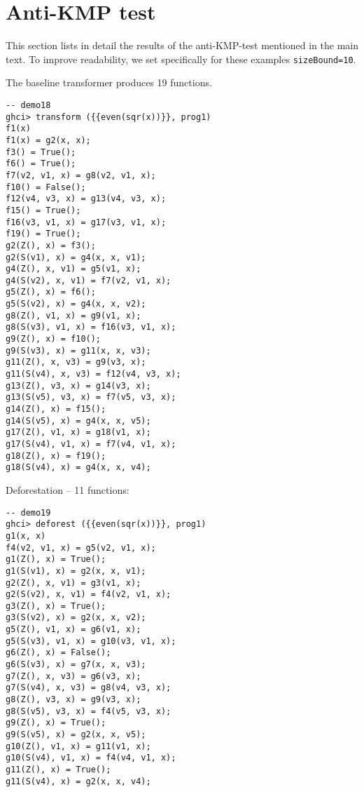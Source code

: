 \section{Anti-KMP test}

This section lists in detail the results of the anti-KMP-test mentioned in the main text.
To improve readability, we set specifically for these examples \texttt{sizeBound=10}.

The baseline transformer produces 19 functions.
\begin{lstlisting}[style=demo,escapechar=!]
-- demo18
ghci> transform ({{even(sqr(x))}}, prog1)
f1(x)
f1(x) = g2(x, x);
f3() = True();
f6() = True();
f7(v2, v1, x) = g8(v2, v1, x);
f10() = False();
f12(v4, v3, x) = g13(v4, v3, x);
f15() = True();
f16(v3, v1, x) = g17(v3, v1, x);
f19() = True();
g2(Z(), x) = f3();
g2(S(v1), x) = g4(x, x, v1);
g4(Z(), x, v1) = g5(v1, x);
g4(S(v2), x, v1) = f7(v2, v1, x);
g5(Z(), x) = f6();
g5(S(v2), x) = g4(x, x, v2);
g8(Z(), v1, x) = g9(v1, x);
g8(S(v3), v1, x) = f16(v3, v1, x);
g9(Z(), x) = f10();
g9(S(v3), x) = g11(x, x, v3);
g11(Z(), x, v3) = g9(v3, x);
g11(S(v4), x, v3) = f12(v4, v3, x);
g13(Z(), v3, x) = g14(v3, x);
g13(S(v5), v3, x) = f7(v5, v3, x);
g14(Z(), x) = f15();
g14(S(v5), x) = g4(x, x, v5);
g17(Z(), v1, x) = g18(v1, x);
g17(S(v4), v1, x) = f7(v4, v1, x);
g18(Z(), x) = f19();
g18(S(v4), x) = g4(x, x, v4);
\end{lstlisting}

Deforestation -- 11 functions:
\begin{lstlisting}[style=demo,escapechar=!]
-- demo19
ghci> deforest ({{even(sqr(x))}}, prog1)
g1(x, x)
f4(v2, v1, x) = g5(v2, v1, x);
g1(Z(), x) = True();
g1(S(v1), x) = g2(x, x, v1);
g2(Z(), x, v1) = g3(v1, x);
g2(S(v2), x, v1) = f4(v2, v1, x);
g3(Z(), x) = True();
g3(S(v2), x) = g2(x, x, v2);
g5(Z(), v1, x) = g6(v1, x);
g5(S(v3), v1, x) = g10(v3, v1, x);
g6(Z(), x) = False();
g6(S(v3), x) = g7(x, x, v3);
g7(Z(), x, v3) = g6(v3, x);
g7(S(v4), x, v3) = g8(v4, v3, x);
g8(Z(), v3, x) = g9(v3, x);
g8(S(v5), v3, x) = f4(v5, v3, x);
g9(Z(), x) = True();
g9(S(v5), x) = g2(x, x, v5);
g10(Z(), v1, x) = g11(v1, x);
g10(S(v4), v1, x) = f4(v4, v1, x);
g11(Z(), x) = True();
g11(S(v4), x) = g2(x, x, v4);
\end{lstlisting}

